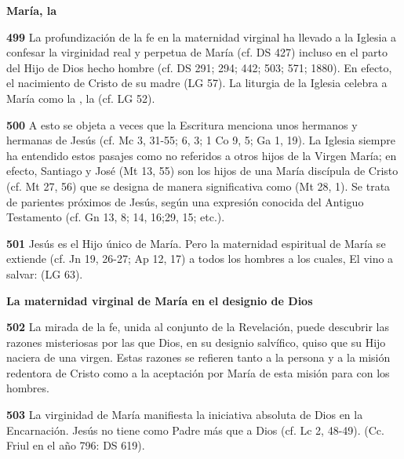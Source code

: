 \textbf{María, la }

\textbf{499} La profundización de la fe en la maternidad virginal ha llevado a la Iglesia a confesar la virginidad real y perpetua de María (cf. DS 427) incluso en el parto del Hijo de Dios hecho hombre (cf. DS 291; 294; 442; 503; 571; 1880). En efecto, el nacimiento de Cristo  de su madre (LG 57). La liturgia de la Iglesia celebra a María como la , la  (cf. LG 52).

\textbf{500} A esto se objeta a veces que la Escritura menciona unos hermanos y hermanas de Jesús (cf. Mc 3, 31-55; 6, 3; 1 Co 9, 5; Ga 1, 19). La Iglesia siempre ha entendido estos pasajes como no referidos a otros hijos de la Virgen María; en efecto, Santiago y José  (Mt 13, 55) son los hijos de una María discípula de Cristo (cf. Mt 27, 56) que se designa de manera significativa como  (Mt 28, 1). Se trata de parientes próximos de Jesús, según una expresión conocida del Antiguo Testamento (cf. Gn 13, 8; 14, 16;29, 15; etc.).

\textbf{501} Jesús es el Hijo único de María. Pero la maternidad espiritual de María se extiende (cf. Jn 19, 26-27; Ap 12, 17) a todos los hombres a los cuales, El vino a salvar:  (LG 63).

\textbf{La maternidad virginal de María en el designio de Dios}

\textbf{502} La mirada de la fe, unida al conjunto de la Revelación, puede descubrir las razones misteriosas por las que Dios, en su designio salvífico, quiso que su Hijo naciera de una virgen. Estas razones se refieren tanto a la persona y a la misión redentora de Cristo como a la aceptación por María de esta misión para con los hombres.

\textbf{503} La virginidad de María manifiesta la iniciativa absoluta de Dios en la Encarnación. Jesús no tiene como Padre más que a Dios (cf. Lc 2, 48-49).  (Cc. Friul en el año 796: DS 619).

